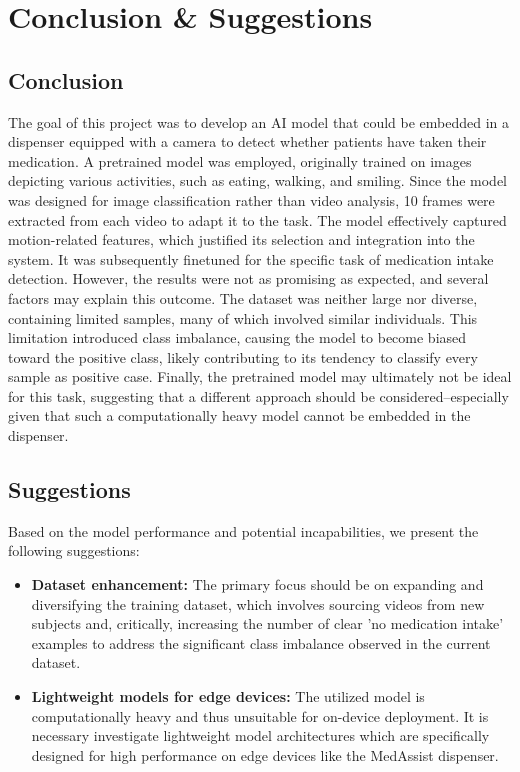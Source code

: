 \documentclass[a4paper,12pt]{article}
\begin{document}
\section{Conclusion \& Suggestions}
\subsection{Conclusion}
The goal of this project was to develop an AI model that could be embedded in a dispenser equipped with a camera to detect 
whether patients have taken their medication. A pretrained model was employed, originally trained on images depicting 
various activities, such as eating, walking, and smiling. Since the model was designed for image classification rather 
than video analysis, 10 frames were extracted from each video to adapt it to the task. The model effectively captured 
motion-related features, which justified its selection and integration into the system. It was subsequently finetuned 
for the specific task of medication intake detection. However, the results were not as promising as expected, and several 
factors may explain this outcome. The dataset was neither large nor diverse, containing limited samples, many of which 
involved similar individuals. This limitation introduced class imbalance, causing the model to become biased toward the 
positive class, likely contributing to its tendency to classify every sample as positive case. Finally, the pretrained 
model may ultimately not be ideal for this task, suggesting that a different approach should be considered--especially 
given that such a computationally heavy model cannot be embedded in the dispenser.

\subsection{Suggestions}

Based on the model performance and potential incapabilities, we present the following suggestions:

\begin{itemize}
    \item \textbf{Dataset enhancement:} The primary focus should be on expanding and diversifying the training dataset, which involves sourcing videos from new subjects and, critically, increasing the number of clear 'no medication intake' examples to address the significant class imbalance observed in the current dataset.
    \item \textbf{Lightweight models for edge devices:} The utilized model is computationally heavy and thus unsuitable for on-device deployment. It is necessary investigate lightweight model architectures which are specifically designed for high performance on edge devices like the MedAssist dispenser. 
\end{itemize}
\end{document}
